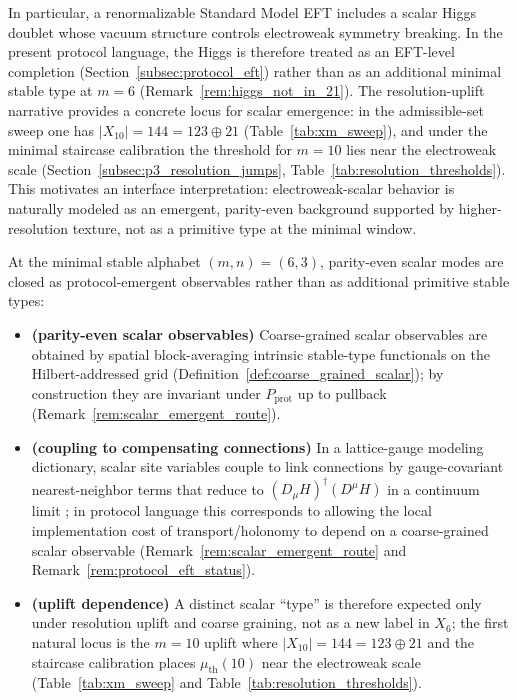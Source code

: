 In particular, a renormalizable Standard Model EFT includes a scalar Higgs doublet whose vacuum structure controls electroweak symmetry breaking.
In the present protocol language, the Higgs is therefore treated as an EFT-level completion (Section~\ref{subsec:protocol_eft}) rather than as an additional minimal stable type at $m=6$ (Remark~\ref{rem:higgs_not_in_21}).
The resolution-uplift narrative provides a concrete locus for scalar emergence:
in the admissible-set sweep one has $|X_{10}|=144=123\oplus 21$ (Table~\ref{tab:xm_sweep}), and under the minimal staircase calibration the threshold for $m=10$ lies near the electroweak scale (Section~\ref{subsec:p3_resolution_jumps}, Table~\ref{tab:resolution_thresholds}).
This motivates an interface interpretation: electroweak-scalar behavior is naturally modeled as an emergent, parity-even background supported by higher-resolution texture, not as a primitive type at the minimal window.

\begin{proposition}\label{prop:scalar_sector_closed}
At the minimal stable alphabet $(m,n)=(6,3)$, parity-even scalar modes are closed as protocol-emergent observables rather than as additional primitive stable types:
\begin{itemize}
\item \textbf{(parity-even scalar observables)} Coarse-grained scalar observables are obtained by spatial block-averaging intrinsic stable-type functionals on the Hilbert-addressed grid (Definition~\ref{def:coarse_grained_scalar}); by construction they are invariant under $P_{\mathrm{prot}}$ up to pullback (Remark~\ref{rem:scalar_emergent_route}).
\item \textbf{(coupling to compensating connections)} In a lattice-gauge modeling dictionary, scalar site variables couple to link connections by gauge-covariant nearest-neighbor terms that reduce to $(D_\mu H)^\dagger(D^\mu H)$ in a continuum limit \cite{Wilson1974,KogutSusskind1975HamiltonianLGT,Rothe2012}; in protocol language this corresponds to allowing the local implementation cost of transport/holonomy to depend on a coarse-grained scalar observable (Remark~\ref{rem:scalar_emergent_route} and Remark~\ref{rem:protocol_eft_status}).
\item \textbf{(uplift dependence)} A distinct scalar ``type'' is therefore expected only under resolution uplift and coarse graining, not as a new label in $X_6$; the first natural locus is the $m=10$ uplift where $|X_{10}|=144=123\oplus 21$ and the staircase calibration places $\mu_{\mathrm{th}}(10)$ near the electroweak scale (Table~\ref{tab:xm_sweep} and Table~\ref{tab:resolution_thresholds}).
\end{itemize}
\end{proposition}

